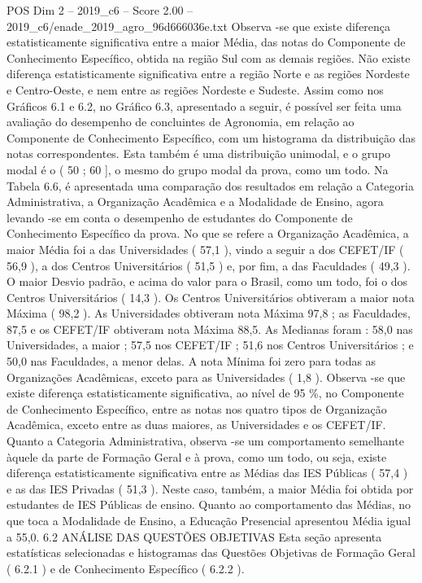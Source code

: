 \begin{textsample}{POS Dim 2 – 2019\_c6 – Score 2.00 – 2019\_c6/enade\_2019\_agro\_96d666036e.txt}
Observa -se que existe diferença estatisticamente significativa entre a maior Média, das notas do Componente de Conhecimento Específico, obtida na região Sul com as demais regiões.
Não existe diferença estatisticamente significativa entre a região Norte e as regiões Nordeste e Centro-Oeste, e nem entre as regiões Nordeste e Sudeste.
Assim como nos Gráficos 6.1 e 6.2, no Gráfico 6.3, apresentado a seguir, é possível ser feita uma avaliação do desempenho de concluintes de Agronomia, em relação ao Componente de Conhecimento Específico, com um histograma da distribuição das notas correspondentes.
Esta também é uma distribuição unimodal, e o grupo modal é o ( 50 ; 60 ], o mesmo do grupo modal da prova, como um todo.
Na Tabela 6.6, é apresentada uma comparação dos resultados em relação a Categoria Administrativa, a Organização Acadêmica e a Modalidade de Ensino, agora levando -se em conta o desempenho de estudantes do Componente de Conhecimento Específico da prova.
No que se refere a Organização Acadêmica, a maior Média foi a das Universidades ( 57,1 ), vindo a seguir a dos CEFET/IF ( 56,9 ), a dos Centros Universitários ( 51,5 ) e, por fim, a das Faculdades ( 49,3 ).
O maior Desvio padrão, e acima do valor para o Brasil, como um todo, foi o dos Centros Universitários ( 14,3 ).
Os Centros Universitários obtiveram a maior nota Máxima ( 98,2 ).
As Universidades obtiveram nota Máxima 97,8 ; as Faculdades, 87,5 e os CEFET/IF obtiveram nota Máxima 88,5.
As Medianas foram : 58,0 nas Universidades, a maior ; 57,5 nos CEFET/IF ; 51,6 nos Centros Universitários ; e 50,0 nas Faculdades, a menor delas.
A nota Mínima foi zero para todas as Organizações Acadêmicas, exceto para as Universidades ( 1,8 ).
Observa -se que existe diferença estatisticamente significativa, ao nível de 95 \%, no Componente de Conhecimento Específico, entre as notas nos quatro tipos de Organização Acadêmica, exceto entre as duas maiores, as Universidades e os CEFET/IF.
Quanto a Categoria Administrativa, observa -se um comportamento semelhante àquele da parte de Formação Geral e à prova, como um todo, ou seja, existe diferença estatisticamente significativa entre as Médias das IES Públicas ( 57,4 ) e as das IES Privadas ( 51,3 ).
Neste caso, também, a maior Média foi obtida por estudantes de IES Públicas de ensino.
Quanto ao comportamento das Médias, no que toca a Modalidade de Ensino, a Educação Presencial apresentou Média igual a 55,0. 6.2 ANÁLISE DAS QUESTÕES OBJETIVAS Esta seção apresenta estatísticas selecionadas e histogramas das Questões Objetivas de Formação Geral ( 6.2.1 ) e de Conhecimento Específico ( 6.2.2 ).

\end{textsample}
